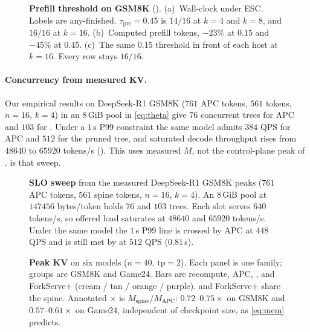 \begin{figure}[t]
\centering
\resizebox{\textwidth}{!}{}
\caption{\textbf{Prefill threshold on GSM8K} ().
(a)~Wall-clock under ESC. Labels are any-finished. $\tau_{\mathrm{pre}}{=}0.45$ is $14/16$ at $k{=}4$ and $k{=}8$, and $16/16$ at $k{=}16$.
(b)~Computed prefill tokens, $-23\%$ at $0.15$ and $-45\%$ at $0.45$.
(c)~The same $0.15$ threshold in front of each host at $k{=}16$. Every row stays $16/16$.}
\label{fig:eval-admit}
\end{figure}

\paragraph{Concurrency from measured KV.}
Our empirical results on DeepSeek-R1 GSM8K ($761$ APC tokens, $561$ \sys tokens, $n{=}16$, $k{=}4$) in an $8$\,GiB pool in \eqref{eq:theta} give $76$ concurrent trees for APC and $103$ for \sys.
Under a $1$\,s P99 \ttft{} constraint the same model admits $384$ QPS for APC and $512$ for the pruned tree, and saturated decode throughput rises from $48640$ to $65920$ tokens/s ().
This uses measured $M$, not the control-plane peak of .
 is that sweep.

\begin{figure}[t]
\centering
\resizebox{\textwidth}{!}{}
\caption{\textbf{SLO sweep} from the measured DeepSeek-R1 GSM8K peaks ($761$ APC tokens, $561$ spine tokens, $n{=}16$, $k{=}4$).
An $8$\,GiB pool at $147456$ bytes/token holds $76$ and $103$ trees.
Each slot serves $640$ tokens/s, so offered load saturates at $48640$ and $65920$ tokens/s.
Under the same model the $1$\,s P99 \ttft{} line is crossed by APC at $448$ QPS and is still met by \sys at $512$ QPS ($0.81$\,s).}
\label{fig:eval-slo}
\end{figure}

\begin{figure}[t]
\centering
\resizebox{\textwidth}{!}{}
\caption{\textbf{Peak KV} on six models ($n{=}40$, $\mathrm{tp}{=}2$).
Each panel is one family; groups are GSM8K and Game24.
Bars are recompute, APC, \sys, and ForkServe+ (cream / tan / orange / purple).
\sys{} and ForkServe+ share the spine.
Annotated $\times$ is $M_{\mathrm{spine}}/M_{\mathrm{APC}}$: $0.72$--$0.75\times$ on GSM8K and $0.57$--$0.61\times$ on Game24, independent of checkpoint size, as \eqref{eq:mem} predicts.}
\label{fig:eval-multi}
\end{figure}


